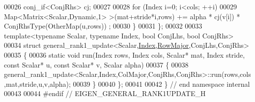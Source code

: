 \begin{DoxyCode}
00026     conj\_if<ConjRhs> cj;
00027 
00028     \textcolor{keywordflow}{for} (Index i=0; i<cols; ++i)
00029       Map<Matrix<Scalar,Dynamic,1> >(mat+stride*i,rows) += alpha * cj(v[i]) * ConjRhsType(OtherMap(u,rows))
      ;
00030   \}
00031 \};
00032 
00033 \textcolor{keyword}{template}<\textcolor{keyword}{typename} Scalar, \textcolor{keyword}{typename} Index, \textcolor{keywordtype}{bool} ConjLhs, \textcolor{keywordtype}{bool} ConjRhs>
00034 \textcolor{keyword}{struct }general\_rank1\_update<Scalar,\hyperlink{namespace_eigen_a62e77e0933482dafde8fe197d9a2cfde}{Index},\hyperlink{group__enums_ggaacded1a18ae58b0f554751f6cdf9eb13acfcde9cd8677c5f7caf6bd603666aae3}{RowMajor},ConjLhs,ConjRhs>
00035 \{
00036   \textcolor{keyword}{static} \textcolor{keywordtype}{void} run(Index rows, Index cols, Scalar* mat, Index stride, \textcolor{keyword}{const} Scalar* u, \textcolor{keyword}{const} Scalar* v, 
      Scalar alpha)
00037   \{
00038     general\_rank1\_update<Scalar,Index,ColMajor,ConjRhs,ConjRhs>::run(rows,cols,mat,stride,u,v,alpha);
00039   \}
00040 \};
00041 
00042 \} \textcolor{comment}{// end namespace internal}
00043 
00044 \textcolor{preprocessor}{#endif // EIGEN\_GENERAL\_RANK1UPDATE\_H}
\end{DoxyCode}
